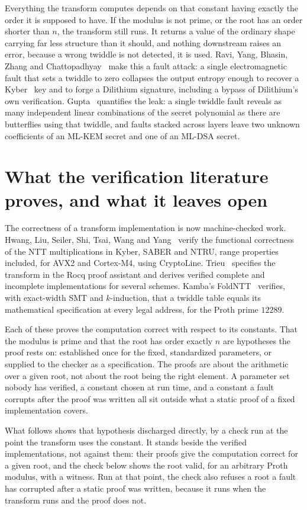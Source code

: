 \documentclass{article}
\begin{document}
Everything the transform computes depends on that constant having exactly the order it is supposed to have. If the modulus is not prime, or the root has an order shorter than \(n\), the transform still runs. It returns a value of the ordinary shape carrying far less structure than it should, and nothing downstream raises an error, because a wrong twiddle is not detected, it is used. Ravi, Yang, Bhasin, Zhang and Chattopadhyay~\cite{ravi} make this a fault attack: a single electromagnetic fault that sets a twiddle to zero collapses the output entropy enough to recover a Kyber~\cite{kyber} key and to forge a Dilithium signature, including a bypass of Dilithium's own verification. Gupta~\cite{gupta} quantifies the leak: a single twiddle fault reveals as many independent linear combinations of the secret polynomial as there are butterflies using that twiddle, and faults stacked across layers leave two unknown coefficients of an ML-KEM secret and one of an ML-DSA secret.

\section{What the verification literature proves, and what it leaves open}

The correctness of a transform implementation is now machine-checked work. Hwang, Liu, Seiler, Shi, Tsai, Wang and Yang~\cite{hwang} verify the functional correctness of the NTT multiplications in Kyber, SABER and NTRU, range properties included, for AVX2 and Cortex-M4, using CryptoLine. Trieu~\cite{trieu} specifies the transform in the Rocq proof assistant and derives verified complete and incomplete implementations for several schemes. Kamba's FoldNTT~\cite{foldntt} verifies, with exact-width SMT and \(k\)-induction, that a twiddle table equals its mathematical specification at every legal address, for the Proth prime \(12289\).

Each of these proves the computation correct with respect to its constants. That the modulus is prime and that the root has order exactly \(n\) are hypotheses the proof rests on: established once for the fixed, standardized parameters, or supplied to the checker as a specification. The proofs are about the arithmetic over a given root, not about the root being the right element. A parameter set nobody has verified, a constant chosen at run time, and a constant a fault corrupts after the proof was written all sit outside what a static proof of a fixed implementation covers.

What follows shows that hypothesis discharged directly, by a check run at the point the transform uses the constant. It stands beside the verified implementations, not against them: their proofs give the computation correct for a given root, and the check below shows the root valid, for an arbitrary Proth modulus, with a witness. Run at that point, the check also refuses a root a fault has corrupted after a static proof was written, because it runs when the transform runs and the proof does not.
\end{document}

